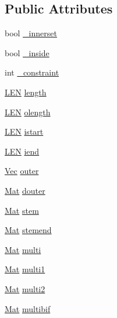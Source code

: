\subsection*{Public Attributes}
\begin{DoxyCompactItemize}
\item 
bool \hyperlink{class_rfold_1_1_matrix_a761e7bc7f006c3ea8b09f9c2d8107e6a}{\+\_\+innerset}
\item 
bool \hyperlink{class_rfold_1_1_matrix_ab5046ea9c3952f87a52002fa583d1e1b}{\+\_\+inside}
\item 
int \hyperlink{class_rfold_1_1_matrix_a8667166785da4cbc4a854fd11d6b062d}{\+\_\+constraint}
\item 
\hyperlink{energy__const_8hh_a05b49c662c073f89e86804f7856622a0}{L\+E\+N} \hyperlink{class_rfold_1_1_matrix_a4e28e0237e378feced3ce0497b0280d3}{length}
\item 
\hyperlink{energy__const_8hh_a05b49c662c073f89e86804f7856622a0}{L\+E\+N} \hyperlink{class_rfold_1_1_matrix_a6c5369e6fe648c02747ce63e40cb32ef}{olength}
\item 
\hyperlink{energy__const_8hh_a05b49c662c073f89e86804f7856622a0}{L\+E\+N} \hyperlink{class_rfold_1_1_matrix_a5880f2f8bd4be305049d3149334370e7}{istart}
\item 
\hyperlink{energy__const_8hh_a05b49c662c073f89e86804f7856622a0}{L\+E\+N} \hyperlink{class_rfold_1_1_matrix_a2b367dc68757e1459981f18afd9c8ab8}{iend}
\item 
\hyperlink{namespace_rfold_aaf02f2c0c40c1dd572dbdd8bc1bde67d}{Vec} \hyperlink{class_rfold_1_1_matrix_ae939207a96342deb8ed1268b9dbdc6d1}{outer}
\item 
\hyperlink{namespace_rfold_a6392dbfbc164230455fdcdb1a0ff53d7}{Mat} \hyperlink{class_rfold_1_1_matrix_a95f02edbb0a09ccd75a47f3baf50d1fe}{douter}
\item 
\hyperlink{namespace_rfold_a6392dbfbc164230455fdcdb1a0ff53d7}{Mat} \hyperlink{class_rfold_1_1_matrix_a20247950e209e5d6d72ef7471c31ec7e}{stem}
\item 
\hyperlink{namespace_rfold_a6392dbfbc164230455fdcdb1a0ff53d7}{Mat} \hyperlink{class_rfold_1_1_matrix_a64d321f4b4a5447961cd0acc356b2758}{stemend}
\item 
\hyperlink{namespace_rfold_a6392dbfbc164230455fdcdb1a0ff53d7}{Mat} \hyperlink{class_rfold_1_1_matrix_aae63edf0279f08764bf31766c2015daf}{multi}
\item 
\hyperlink{namespace_rfold_a6392dbfbc164230455fdcdb1a0ff53d7}{Mat} \hyperlink{class_rfold_1_1_matrix_a60276112ff38bf30f411846caa101ad4}{multi1}
\item 
\hyperlink{namespace_rfold_a6392dbfbc164230455fdcdb1a0ff53d7}{Mat} \hyperlink{class_rfold_1_1_matrix_acd86fda1cabf4c1aa04ab33661644b71}{multi2}
\item 
\hyperlink{namespace_rfold_a6392dbfbc164230455fdcdb1a0ff53d7}{Mat} \hyperlink{class_rfold_1_1_matrix_ab7337ede6bd124b14bd4ffd706852f56}{multibif}
\end{DoxyCompactItemize}
